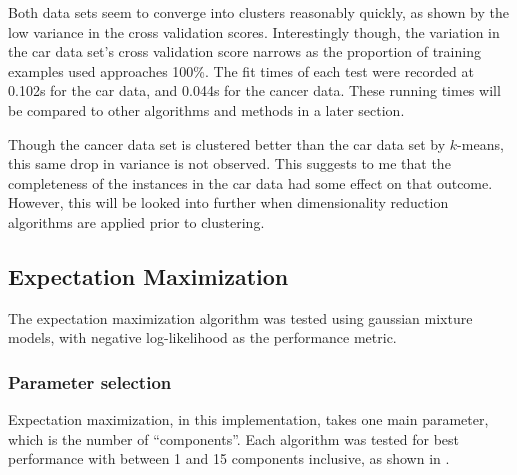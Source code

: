 \documentclass{article}
\begin{document}
        Both data sets seem to converge into clusters reasonably quickly, as shown by the low variance in the cross validation scores. Interestingly though, the variation in the car data set's cross validation score narrows as the proportion of training examples used approaches 100\%. The fit times of each test were recorded at 0.102s for the car data, and 0.044s for the cancer data. These running times will be compared to other algorithms and methods in a later section.

        Though the cancer data set is clustered better than the car data set by $k$-means, this same drop in variance is not observed. This suggests to me that the completeness of the instances in the car data had some effect on that outcome. However, this will be looked into further when dimensionality reduction algorithms are applied prior to clustering.

    \subsection{Expectation Maximization}
      The expectation maximization algorithm was tested using gaussian mixture models, with negative log-likelihood as the performance metric.

      \subsubsection{Parameter selection}
        Expectation maximization, in this implementation, takes one main parameter, which is the number of ``components''. Each algorithm was tested for best performance with between 1 and 15 components inclusive, as shown in .
\end{document}
